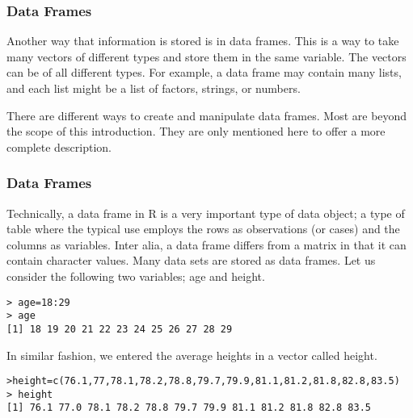 \frametitle{Data Frames}


Another way that information is stored is in data frames. This is a way to take many vectors of different types and store them in the same variable. The vectors can be of all different types. For example, a data frame may contain many lists, and each list might be a list of factors, strings, or numbers.

There are different ways to create and manipulate data frames. Most are beyond the scope of this introduction. They are only mentioned here to offer a more complete description.
\frametitle{Data Frames}
Technically, a data frame in R is a very important type of data object;  a type of table where the typical use employs the rows as observations (or cases) and the columns as variables.
Inter alia, a data frame differs from a matrix in that it can contain character values.
Many data sets are stored as data frames.
Let us consider the following two variables; age and height.
\begin{verbatim}
> age=18:29
> age
[1] 18 19 20 21 22 23 24 25 26 27 28 29
\end{verbatim}

In similar fashion, we entered the average heights in a vector called height.
\begin{verbatim}
>height=c(76.1,77,78.1,78.2,78.8,79.7,79.9,81.1,81.2,81.8,82.8,83.5)
> height
[1] 76.1 77.0 78.1 78.2 78.8 79.7 79.9 81.1 81.2 81.8 82.8 83.5
\end{verbatim}

